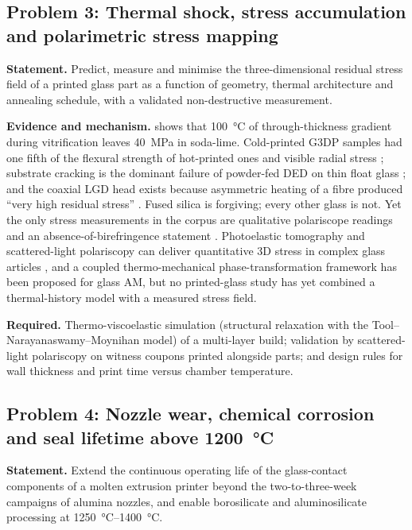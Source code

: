 \subsection{Problem 3: Thermal shock, stress accumulation and polarimetric stress mapping}
\textbf{Statement.} Predict, measure and minimise the three-dimensional residual stress field of a printed glass part as a function of geometry, thermal architecture and annealing schedule, with a validated non-destructive measurement.

\textbf{Evidence and mechanism.}  shows that \SI{100}{\celsius} of through-thickness gradient during vitrification leaves \SI{40}{MPa} in soda-lime. Cold-printed G3DP samples had one fifth of the flexural strength of hot-printed ones and visible radial stress \citep{klein2015}; substrate cracking is the dominant failure of powder-fed DED on thin float glass \citep{spirrett2023}; and the coaxial LGD head exists because asymmetric heating of a fibre produced ``very high residual stress'' \citep{lgd2021coaxial}. Fused silica is forgiving; every other glass is not. Yet the only stress measurements in the corpus are qualitative polariscope readings \citep{klein2015} and an absence-of-birefringence statement \citep{kth2022bonding}. Photoelastic tomography and scattered-light polariscopy can deliver quantitative 3D stress in complex glass articles \citep{aben2008}, and a coupled thermo-mechanical phase-transformation framework has been proposed for glass AM, but no printed-glass study has yet combined a thermal-history model with a measured stress field.

\textbf{Required.} Thermo-viscoelastic simulation (structural relaxation with the Tool--Narayanaswamy--Moynihan model) of a multi-layer build; validation by scattered-light polariscopy on witness coupons printed alongside parts; and design rules for wall thickness and print time versus chamber temperature.

\subsection{Problem 4: Nozzle wear, chemical corrosion and seal lifetime above \SI{1200}{\celsius}}
\textbf{Statement.} Extend the continuous operating life of the glass-contact components of a molten extrusion printer beyond the two-to-three-week campaigns of alumina nozzles, and enable borosilicate and aluminosilicate processing at \SIrange{1250}{1400}{\celsius}.

